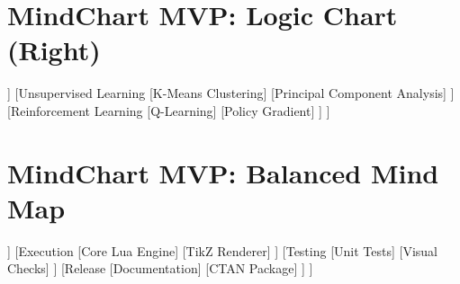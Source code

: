\documentclass{article}
\begin{document}
\section*{MindChart MVP: Logic Chart (Right)}

\begin{mindchart}[theme=rainbow, layout=right, style=classic]
[Machine Learning
  [Supervised Learning
    [Linear Regression $\hat{y} = Wx + b$]
    [Decision Trees]
    [Support Vector Machines]
  ]
  [Unsupervised Learning
    [K-Means Clustering]
    [Principal Component Analysis]
  ]
  [Reinforcement Learning
    [Q-Learning]
    [Policy Gradient]
  ]
]
\end{mindchart}

\vspace{1.5cm}

\section*{MindChart MVP: Balanced Mind Map}

\begin{mindchart}[theme=business, layout=balanced, style=classic]
[Central Project
  [Planning
    [Requirements]
    [Architecture]
  ]
  [Execution
    [Core Lua Engine]
    [TikZ Renderer]
  ]
  [Testing
    [Unit Tests]
    [Visual Checks]
  ]
  [Release
    [Documentation]
    [CTAN Package]
  ]
]
\end{mindchart}
\end{document}
